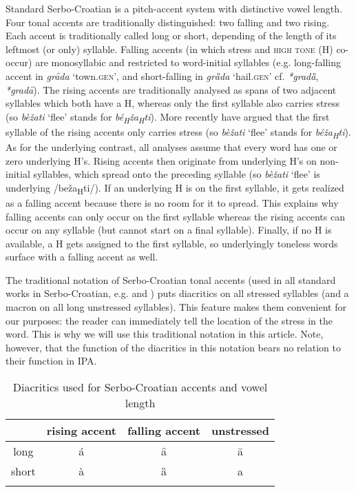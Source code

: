 \documentclass[output=paper,modfonts,nonflat
]{langsci/langscibook}
\begin{document}
Standard Serbo-Croatian is a pitch-accent system with distinctive vowel length. Four tonal accents are traditionally distinguished: two falling and two rising. Each accent is traditionally called long or short, depending of the length of its leftmost (or only) syllable. Falling accents (in which stress and \textsc{high tone} (H) co-occur) are monosyllabic and restricted to word-initial syllables (e.g. long-falling accent in \textit{grȃda} `town.\textsc{gen}', and short-falling in \textit{grȁda} `hail.\textsc{gen}' cf. \textit{*gradȁ}, \textit{*gradȃ}). The rising accents are traditionally analysed as spans of two adjacent syllables which both have a H, whereas only the first syllable also carries stress (so \textit{bèžati} `flee' stands for \textit{bé\textsubscript{H}ža\textsubscript{H}ti}). More recently \citet{Zsiga-Zec2013} have argued that the first syllable of the rising accents only carries stress (so \textit{bèžati} `flee' stands for \textit{béža\textsubscript{H}ti}). As for the underlying contrast, all analyses assume that every word has one or zero underlying H's. Rising accents then originate from underlying H's on non-initial syllables, which spread onto the preceding syllable (so \textit{bèžati} `flee' is underlying /beža\textsubscript{H}ti/). If an underlying H is on the first syllable, it gets realized as a falling accent because there is no room for it to spread. This explains why falling accents can only occur on the first syllable whereas the rising accents can occur on any syllable (but cannot start on a final syllable). Finally, if no H is available, a H gets assigned to the first syllable, so underlyingly toneless words surface with a falling accent as well. 

The traditional notation of Serbo-Croatian tonal accents (used in all standard works in Serbo-Croatian, e.g. \citealt{Stevanovic1979} and \citealt{Klaic2013}) puts diacritics on all stressed syllables (and a macron on all long unstressed syllables). This feature makes them convenient for our purposes: the reader can immediately tell the location of the stress in the word. This is why we will use this traditional notation in this article. Note, however, that the function of the diacritics in this notation bears no relation to their function in IPA. 

\begin{table}
\caption{Diacritics used for Serbo-Croatian accents and vowel length}
\label{tab:kager:1}
 \begin{tabular}{ c  c  c c  }
\lsptoprule & rising accent & falling accent & unstressed \\ %
  \midrule
  long  &   á  &    ȃ  &    ā\\
  short  &  à &  ȁ &   a\\
 \lspbottomrule
 \end{tabular}
\end{table}
\end{document}

